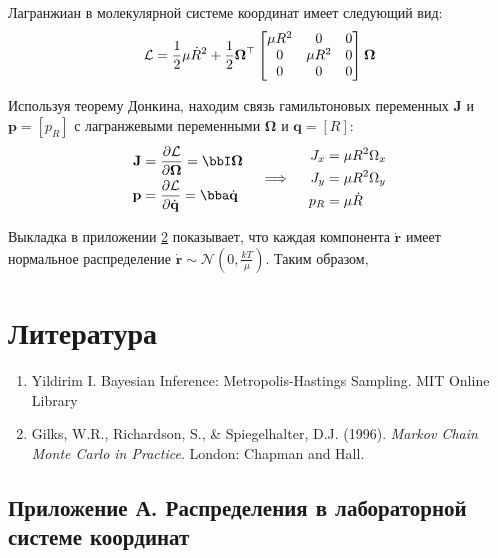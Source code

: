 \documentclass[12pt]{article}
\newcommand{\lb}{\left(}
\newcommand{\rb}{\right)}
\newcommand{\mf}{\mathbf}
\newcommand{\mL}{\mathcal{L}}
\begin{document}
Лагранжиан в молекулярной системе координат имеет следующий вид:
\begin{gather}
\mL = \frac{1}{2} \mu \dot{R}^2 + \frac{1}{2} \mf{\Omega}^\top
\begin{bmatrix}
		\mu R^2 & 0 & 0 \\
		0 & \mu R^2 & 0 \\
		0 & 0 & 0
\end{bmatrix}
\mf{\Omega} \notag
\end{gather}

Используя теорему Донкина, находим связь гамильтоновых переменных $\mf{J}$ и $\mf{p} = \left[ p_R \right]$ с лагранжевыми переменными $\mf{\Omega}$ и $\mf{q} = \left[ R \right]$:
\begin{gather}
\begin{aligned}
\mf{J} &= \frac{\partial \mL}{\partial \mf{\Omega}} = \bbI \mf{\Omega} \\
\mf{p} &= \frac{\partial \mL}{\partial \dot{\mf{q}}} = \bba \dot{\mf{q}}
\end{aligned}
\quad \implies \quad
\begin{aligned}
		J_x &= \mu R^2 \Omega_x \\
		J_y &= \mu R^2 \Omega_y \\
		p_R &= \mu \dot{R}
\end{aligned} \label{3}
\end{gather}

Выкладка в приложении \ref{app1} показывает, что каждая компонента $\dot{\mf{r}}$ имеет нормальное распределение $\dot{\mf{r}} \sim \mathcal{N} \lb 0, \displaystyle \frac{kT}{\mu} \rb$. Таким образом, 

\newpage
\section{Литература}
\begin{enumerate}
	\item Yildirim I. Bayesian Inference: Metropolis-Hastings Sampling. MIT Online Library
	\item Gilks, W.R., Richardson, S., \& Spiegelhalter, D.J. (1996). \textit{Markov Chain Monte Carlo in Practice}. London: Chapman and Hall.
\end{enumerate}

\newpage


\begin{appendices}
\section{Приложение А. Распределения в лабораторной системе координат} \label{app1}

\end{appendices}
\end{document}
